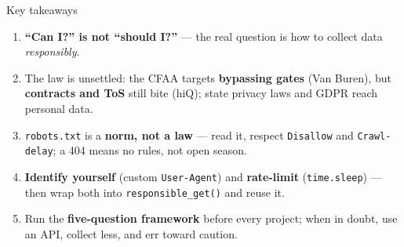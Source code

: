\documentclass[9pt,aspectratio=169]{beamer}
\begin{document}
\begin{frame}{Key takeaways}
    \begin{enumerate}
        \item \textbf{``Can I?'' is not ``should I?''} --- the real question is how to collect data \textit{responsibly}.
        \item The law is unsettled: the CFAA targets \textbf{bypassing gates} (Van Buren), but \textbf{contracts and ToS} still bite (hiQ); state privacy laws and GDPR reach personal data.
        \item \texttt{robots.txt} is a \textbf{norm, not a law} --- read it, respect \texttt{Disallow} and \texttt{Crawl-delay}; a 404 means no rules, not open season.
        \item \textbf{Identify yourself} (custom \texttt{User-Agent}) and \textbf{rate-limit} (\texttt{time.sleep}) --- then wrap both into \texttt{responsible\_get()} and reuse it.
        \item Run the \textbf{five-question framework} before every project; when in doubt, use an API, collect less, and err toward caution.
    \end{enumerate}
    \vspace{0.75em}
\end{frame}
\end{document}
